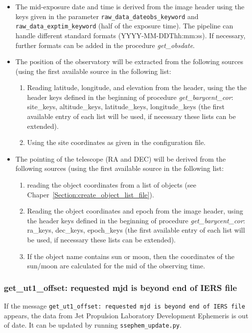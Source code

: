 \documentclass[10pt,a4paper]{article}
\begin{document}
\begin{itemize}
 \item The mid-exposure date and time is derived from the image header using the keys given in the parameter \verb|raw_data_dateobs_keyword| and \verb|raw_data_exptim_keyword| (half of the exposure time). The pipeline can handle different standard formats (YYYY-MM-DDThh:mm:ss). If necessary, further formats can be added in the procedure \textit{get\_obsdate}.
 \item The position of the observatory will be extracted from the following sources (using the first available source in the following list:
 \begin{enumerate}\setlength\itemsep{0em}
  \item Reading latitude, longitude, and elevation from the header, using the the header keys defined in the beginning of procedure \textit{get\_barycent\_cor}: site\_keys, altitude\_keys, latitude\_keys, longitude\_keys (the first available entry of each list will be used, if necessary these lists can be extended).
  \item Using the site coordinates as given in the configuration file.
 \end{enumerate}
 \item The pointing of the telescope (RA and DEC) will be derived from the following sources (using the first available source in the following list:
 \begin{enumerate}\setlength\itemsep{0em}
  \item reading the object coordinates from a list of objects (see Chaper~\ref{Section:create_object_list_file}).
  \item Reading the object coordinates and epoch from the image header, using the header keys defined in the beginning of procedure \textit{get\_barycent\_cor}: ra\_keys, dec\_keys, epoch\_keys (the first available entry of each list will be used, if necessary these lists can be extended).
  \item If the object name contains sun or moon, then the coordinates of the sun/moon are calculated for the mid of the observing time.
 \end{enumerate}
\end{itemize}

\subsubsection{get\_ut1\_offset: requested mjd is beyond end of IERS file}
\label{Section:update_ssephem}
If the message \verb|get_ut1_offset: requested mjd is beyond end of IERS file| appears, the data from Jet Propulsion Laboratory Development Ephemeris is out of date. It can be updated by running \verb|ssephem_update.py|. 
\end{document}
